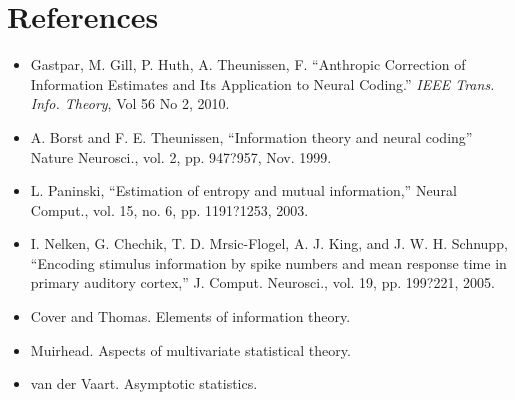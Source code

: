 \documentclass[12pt]{article}
\begin{document}
\section{References}
\begin{itemize}
\item Gastpar, M.  Gill, P.  Huth, A.  Theunissen, F. ``Anthropic Correction of Information Estimates and Its Application to Neural Coding.'' \emph{IEEE Trans. Info. Theory}, Vol 56 No 2, 2010.
\item  A. Borst and F. E. Theunissen, ``Information theory and neural coding''
Nature Neurosci., vol. 2, pp. 947?957, Nov. 1999.
\item L. Paninski, ``Estimation of entropy and mutual information,'' Neural
Comput., vol. 15, no. 6, pp. 1191?1253, 2003.
\item I. Nelken, G. Chechik, T. D. Mrsic-Flogel, A. J. King, and J. W. H.
Schnupp, ``Encoding stimulus information by spike numbers and mean
response time in primary auditory cortex,'' J. Comput. Neurosci., vol.
19, pp. 199?221, 2005.
\item Cover and Thomas.  Elements of information theory.
\item Muirhead.  Aspects of multivariate statistical theory.
\item van der Vaart.  Asymptotic statistics.
\end{itemize}
\end{document}
